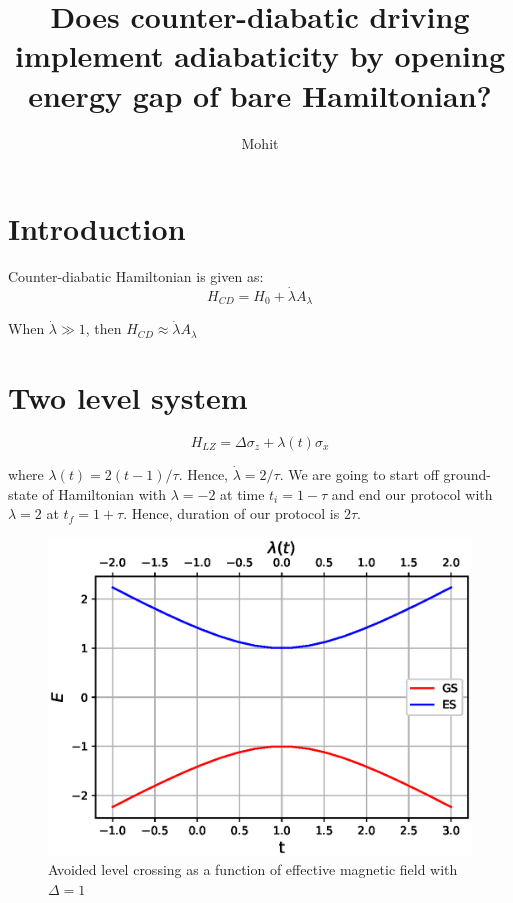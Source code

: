 \documentclass[11pt,a4paper]{article}
\author{Mohit}
\title{Does counter-diabatic driving implement adiabaticity by opening energy gap of bare Hamiltonian?  }
\begin{document}
\maketitle
\section{Introduction}

Counter-diabatic Hamiltonian is given as:
\begin{equation}
H_{CD}= H_0 + \dot{\lambda} A_{\lambda} 
\end{equation}

When $\dot{\lambda} \gg 1$, then $H_{CD} \approx \dot{\lambda} A_{\lambda}$

\section{Two level system}
\begin{equation}
H_{LZ}= \Delta \sigma_z + \lambda(t) \sigma_x
\end{equation}

where $\lambda(t)= 2(t-1)/\tau$. Hence, $\dot{\lambda}= 2/\tau$. We are going to start off ground-state of Hamiltonian with $\lambda=-2$ at time $t_i= 1- \tau$ and end our protocol with  $\lambda=2$ at $t_f= 1+ \tau$. Hence, duration of our protocol is $2 \tau$. 

\begin{figure}[!ht]
\begin{center}
\includegraphics[scale=0.5]{pics/energy_LZ.eps} 
\caption{Avoided level crossing as a function of effective magnetic field with $\Delta=1$ }
\end{center}
\end{figure}
\end{document}
